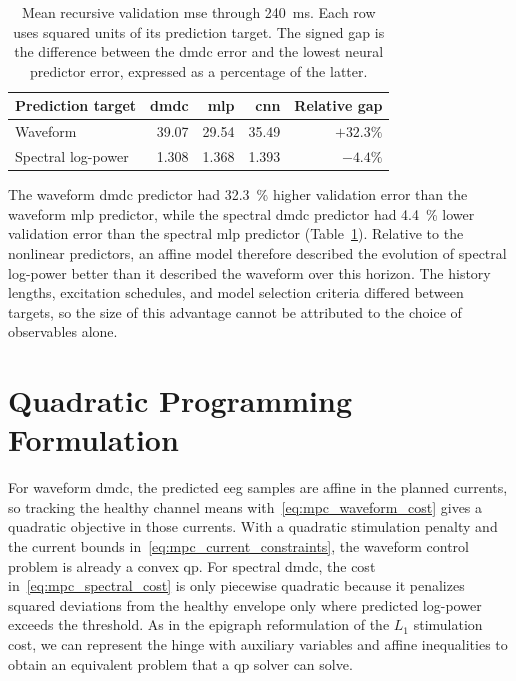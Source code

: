 \begin{table}
  \centering
  \caption{Mean recursive validation \ac{mse} through \SI{240}{\milli\second}. Each row uses squared units of its prediction target. The signed gap is the difference between the \ac{dmdc} error and the lowest neural predictor error, expressed as a percentage of the latter.}\label{tab:dmdc_representation_gap}
  \begin{tabular}{lrrrr}
    \toprule
    Prediction target & \ac{dmdc} & \ac{mlp} & \ac{cnn} & Relative gap \\
    \midrule
    Waveform             & 39.07 & 29.54 & 35.49 & \(+32.3\%\) \\
    Spectral log-power   & 1.308 & 1.368 & 1.393 & \(-4.4\%\)  \\
    \bottomrule
  \end{tabular}
\end{table}

The waveform \ac{dmdc} predictor had \SI{32.3}{\percent} higher validation error than the waveform \ac{mlp} predictor, while the spectral \ac{dmdc} predictor had \SI{4.4}{\percent} lower validation error than the spectral \ac{mlp} predictor (Table~\ref{tab:dmdc_representation_gap}).
Relative to the nonlinear predictors, an affine model therefore described the evolution of spectral log-power better than it described the waveform over this horizon.
The history lengths, excitation schedules, and model selection criteria differed between targets, so the size of this advantage cannot be attributed to the choice of observables alone.

\FloatBarrier
\section{Quadratic Programming Formulation}

For waveform \ac{dmdc}, the predicted \ac{eeg} samples are affine in the planned currents, so tracking the healthy channel means with~\eqref{eq:mpc_waveform_cost} gives a quadratic objective in those currents.
With a quadratic stimulation penalty and the current bounds in~\eqref{eq:mpc_current_constraints}, the waveform control problem is already a convex \ac{qp}.
For spectral \ac{dmdc}, the cost in~\eqref{eq:mpc_spectral_cost} is only piecewise quadratic because it penalizes squared deviations from the healthy envelope only where predicted log-power exceeds the threshold.
As in the epigraph reformulation of the \(L_1\) stimulation cost, we can represent the hinge with auxiliary variables and affine inequalities to obtain an equivalent problem that a \ac{qp} solver can solve.

